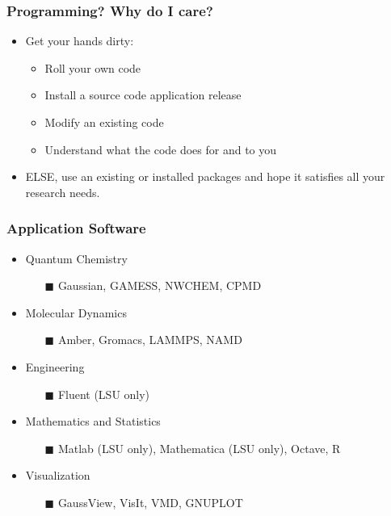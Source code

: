 \documentclass[slidestop,mathserif,compress,xcolor=svgnames,table]{beamer}
\begin{document}
\begin{frame}[c]
  \frametitle{\small Programming? Why do I care?}
  \begin{itemize}
    \item Get your hands dirty:
    \begin{itemize}
      \item Roll your own code
      \item Install a source code application release
      \item Modify an existing code
      \item Understand what the code does for and to you
    \end{itemize}
    \item ELSE, use an existing or installed packages and hope it satisfies all your research needs.
  \end{itemize}
\end{frame}

\begin{frame}[c]
  \frametitle{\small Application Software}
  \begin{itemize}
    \item Quantum Chemistry
      \begin{enumerate}
        \item[$\blacksquare$] Gaussian, GAMESS, NWCHEM, CPMD
      \end{enumerate}
    \item Molecular Dynamics
      \begin{enumerate}
        \item[$\blacksquare$] Amber, Gromacs, LAMMPS, NAMD
      \end{enumerate}
    \item Engineering
      \begin{enumerate}
        \item[$\blacksquare$] Fluent (LSU only)
      \end{enumerate}
    \item Mathematics and Statistics
      \begin{enumerate}
        \item[$\blacksquare$] Matlab (LSU only), Mathematica (LSU only), Octave, R
      \end{enumerate}
    \item Visualization
      \begin{enumerate}
        \item[$\blacksquare$] GaussView, VisIt, VMD, GNUPLOT
      \end{enumerate}
  \end{itemize}
\end{frame}
\end{document}
